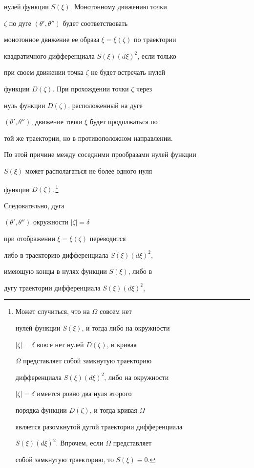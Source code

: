 \begin{pf}
нулей функции $S(\xi)$. Монотонному движению точки


$\zeta$ по дуге $(\theta', \theta'')$ будет соответствовать


монотонное движение ее образа $\xi=\xi(\zeta)$ по траектории


квадратичного дифференциала $S(\xi)(d\xi)^{2}$, если только


при своем движении точка $\zeta$ не будет встречать нулей


функции $D(\zeta)$. При прохождении точки $\zeta$ через 


нуль функции $D(\zeta)$, расположенный на дуге


$(\theta', \theta'')$, движение точки $\xi$ будет продолжаться по 


той же траектории, но в противоположном направлении.


По этой причине между соседними прообразами нулей функции


$S(\xi)$ может располагаться не более одного нуля


функции $D(\zeta)$.\,\footnote{Может случиться, что на $\Omega$ совсем нет


нулей функции $S(\xi)$, и тогда либо на окружности 


$|\zeta|=\delta$ вовсе нет нулей $D(\zeta)$, и кривая


$\Omega$ представляет собой замкнутую траекторию


дифференциала $S(\xi)(d\xi)^{2}$, либо на окружности


$|\zeta|=\delta$ имеется ровно два нуля второго


порядка функции $D(\zeta)$, и тогда кривая $\Omega$


является разомкнутой дугой траектории дифференциала 


$S(\xi)(d\xi)^{2}$. Впрочем, если $\Omega$ представляет 


собой замкнутую траекторию, то $S(\xi)\equiv 0$.} 




Следовательно, дуга 


$(\theta', \theta'')$ окружности $|\zeta|=\delta$


при отображении $\xi=\xi(\zeta)$ переводится


либо в траекторию дифференциала $S(\xi)(d\xi)^{2}$,


имеющую концы в нулях функции $S(\xi)$, либо в


дугу траектории дифференциала $S(\xi)(d\xi)^{2}$,



\end{pf}
